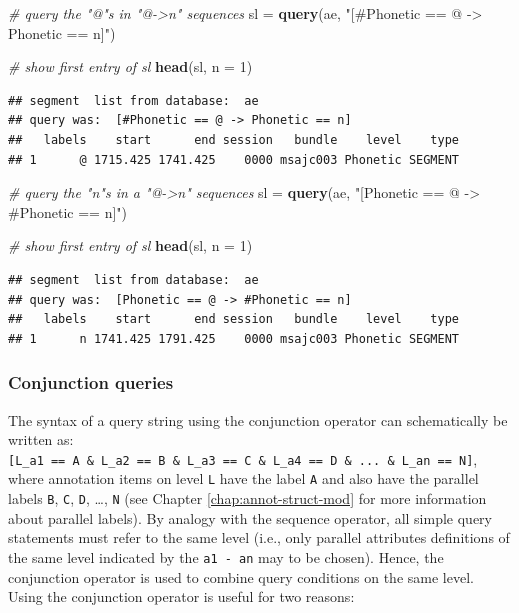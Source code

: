 \documentclass[]{book}
\newenvironment{Shaded}{\begin{snugshade}}{\end{snugshade}}
\newcommand{\CommentTok}[1]{\textcolor[rgb]{0.56,0.35,0.01}{\textit{#1}}}
\newcommand{\DataTypeTok}[1]{\textcolor[rgb]{0.13,0.29,0.53}{#1}}
\newcommand{\DecValTok}[1]{\textcolor[rgb]{0.00,0.00,0.81}{#1}}
\newcommand{\KeywordTok}[1]{\textcolor[rgb]{0.13,0.29,0.53}{\textbf{#1}}}
\newcommand{\NormalTok}[1]{#1}
\newcommand{\StringTok}[1]{\textcolor[rgb]{0.31,0.60,0.02}{#1}}
\begin{document}
\begin{Shaded}
\begin{Highlighting}[]
\CommentTok{# query the "@"s in "@->n" sequences}
\NormalTok{sl =}\StringTok{ }\KeywordTok{query}\NormalTok{(ae, }\StringTok{"[#Phonetic == @ -> Phonetic == n]"}\NormalTok{)}

\CommentTok{# show first entry of sl}
\KeywordTok{head}\NormalTok{(sl, }\DataTypeTok{n =} \DecValTok{1}\NormalTok{)}
\end{Highlighting}
\end{Shaded}

\begin{verbatim}
## segment  list from database:  ae 
## query was:  [#Phonetic == @ -> Phonetic == n] 
##   labels    start      end session   bundle    level    type
## 1      @ 1715.425 1741.425    0000 msajc003 Phonetic SEGMENT
\end{verbatim}

\begin{Shaded}
\begin{Highlighting}[]
\CommentTok{# query the "n"s in a "@->n" sequences}
\NormalTok{sl =}\StringTok{ }\KeywordTok{query}\NormalTok{(ae, }\StringTok{"[Phonetic == @ -> #Phonetic == n]"}\NormalTok{)}

\CommentTok{# show first entry of sl}
\KeywordTok{head}\NormalTok{(sl, }\DataTypeTok{n =} \DecValTok{1}\NormalTok{)}
\end{Highlighting}
\end{Shaded}

\begin{verbatim}
## segment  list from database:  ae 
## query was:  [Phonetic == @ -> #Phonetic == n] 
##   labels    start      end session   bundle    level    type
## 1      n 1741.425 1791.425    0000 msajc003 Phonetic SEGMENT
\end{verbatim}

\hypertarget{conjunction-queries}{%
\subsubsection{Conjunction queries}\label{conjunction-queries}}

The syntax of a query string using the conjunction operator can schematically be written as: \texttt{{[}L\_a1\ ==\ A\ \&\ L\_a2\ ==\ B\ \&\ L\_a3\ ==\ C\ \&\ L\_a4\ ==\ D\ \&\ ...\ \&\ L\_an\ ==\ N{]}}, where annotation items on level \texttt{L} have the label \texttt{A} and also have the parallel labels \texttt{B}, \texttt{C}, \texttt{D}, \ldots{}, \texttt{N} (see Chapter \ref{chap:annot-struct-mod} for more information about parallel labels). By analogy with the sequence operator, all simple query statements must refer to the same level (i.e., only parallel attributes definitions of the same level indicated by the \texttt{a1\ -\ an} may to be chosen). Hence, the conjunction operator is used to combine query conditions on the same level. Using the conjunction operator is useful for two reasons:
\end{document}
